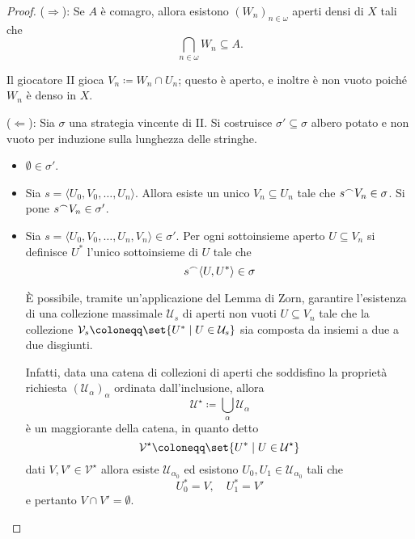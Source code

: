 \documentclass[titlepage]{article}
\newcommand{\1}{\mathds{1}}
\newcommand{\concat}{\null^{\frown}} %
\theoremstyle{definition}%
\theoremstyle{plain}
\theoremstyle{remark}
\begin{document}
\begin{proof}
(\(\Rightarrow\)): Se \(A\) è comagro, allora esistono \((W_{n})_{n \in\omega}\) aperti densi di \(X\) tali che
\begin{equation*}
\bigcap_{n \in\omega} W_{n} \subseteq A.
\end{equation*}

Il giocatore II gioca \(V_{n} \coloneqq W_{n}\cap U_{n}\); questo è aperto, e inoltre è non vuoto poiché \(W_{n}\) è denso in \(X\).

(\(\Leftarrow\)): Sia \(\sigma\) una strategia vincente di II. Si costruisce \(\sigma' \subseteq \sigma\) albero potato e non vuoto per induzione sulla lunghezza delle stringhe.
\begin{itemize}
\item \(\emptyset \in \sigma'\).
\item Sia \(s=\langle U_{0},V_{0},\dots,U_{n}\rangle\). Allora esiste un unico \(V_{n} \subseteq U_{n}\) tale che \(s\concat V_{n} \in \sigma\). Si pone \(s\concat V_{n} \in \sigma'\).
\item Sia \(s = \langle U_{0},V_{0},\dots, U_{n}, V_{n}\rangle \in \sigma'\). Per ogni sottoinsieme aperto \(U \subseteq V_{n}\) si definisce \(U^{*}\) l'unico sottoinsieme di \(U\) tale che
\begin{equation*}
  s\concat \langle U,U^{*}\rangle \in \sigma
\end{equation*}

È possibile, tramite un'applicazione del Lemma di Zorn, garantire l'esistenza di una collezione massimale \(\mathcal{U}_{s}\) di aperti non vuoti \(U \subseteq V_{n}\) tale che la collezione \(\mathcal{V}_{s} \coloneqq \set{U^{*}\mid U \in \mathcal{U}_{s}}\) sia composta da insiemi a due a due disgiunti.

Infatti, data una catena di collezioni di aperti che soddisfino la proprietà richiesta \((\mathcal{U}_{\alpha})_{\alpha}\) ordinata dall'inclusione, allora
\begin{equation*}
\mathcal{U}^{\star}\coloneqq \bigcup_{\alpha} \mathcal{U}_{\alpha}
\end{equation*}
è un maggiorante della catena, in quanto detto
\begin{equation*}
\mathcal{V}^{\star} \coloneqq \set{U^{*}\mid U \in \mathcal{U}^{\star}}
\end{equation*}
dati \(V,V' \in \mathcal{V}^{\star}\) allora esiste \(\mathcal{U}_{\alpha_{0}}\) ed esistono \(U_{0},U_{1} \in \mathcal{U}_{\alpha_{0}}\) tali che
\begin{equation*}
U_{0}^{*}=V,\quad U_{1}^{*} = V'
\end{equation*}
e pertanto \(V\cap V' =\emptyset\).


\end{itemize}
\end{proof}
\end{document}
